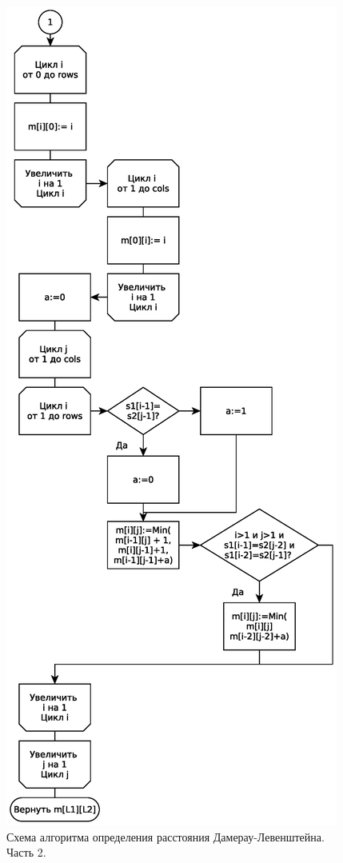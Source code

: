 \begin{figure}
    \centering
    \includegraphics[height=0.75\textheight]{schemes/levenshtein-damerau-eps-2}
    \caption{Схема алгоритма определения расстояния Дамерау-Левенштейна. Часть 2.}
    \label{levenshtein-damerau-scheme-part-2}
\end{figure}

